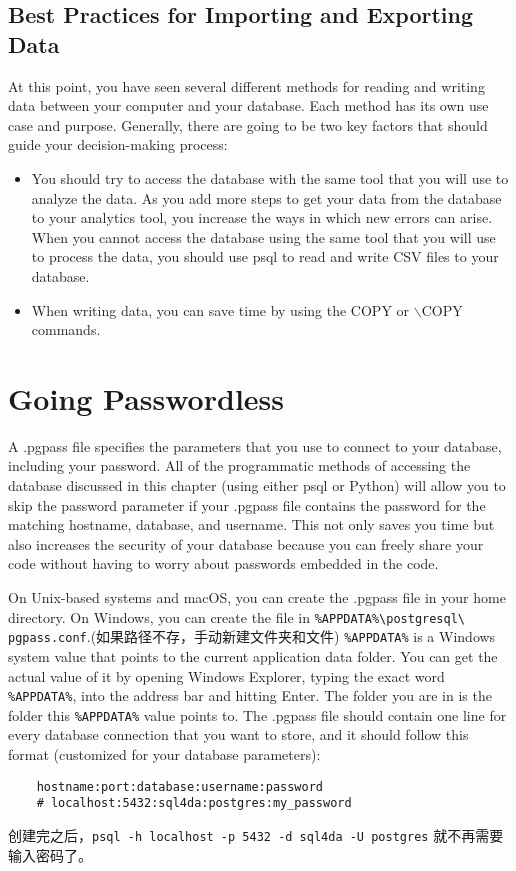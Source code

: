 \subsection{Best Practices for Importing and Exporting Data}
At this point, you have seen several different methods for reading and writing data
between your computer and your database. Each method has its own use case and
purpose. Generally, there are going to be two key factors that should guide your
decision-making process:
\begin{itemize}
    \item You should try to access the database with the same tool that you will use to analyze the data. As you add more steps to get your data from the database to your analytics tool, you increase the ways in which new errors can arise. When you cannot access the database using the same tool that you will use to process the data, you should use psql to read and write CSV files to your database.
    \item  When writing data, you can save time by using the COPY or $\backslash$COPY commands.
\end{itemize}
\section{Going Passwordless}
A .pgpass file specifies the parameters that you use to connect to your database, including your password. All of the programmatic methods of accessing the database discussed in this chapter (using either psql or Python) will allow you to skip the password parameter if your .pgpass file contains the password for the matching hostname, database, and username. This not only saves you time but also increases the security of your database because you can freely share your code without having to worry about passwords embedded in the code.

On Unix-based systems and macOS, you can create the .pgpass file in your home directory. On Windows, you can create the file in \verb|%APPDATA%\postgresql\ pgpass.conf|.(如果路径不存，手动新建文件夹和文件) \verb|%APPDATA%| is a Windows system value that points to the current application data folder. You can get the actual value of it by opening Windows Explorer, typing the exact word \verb|%APPDATA%|, into the address bar and hitting Enter. The folder you are in is the folder this \verb|%APPDATA%| value points to. The .pgpass file should contain one line for every database connection that you want to store, and it should follow this format (customized for your database parameters):
\begin{verbatim}
    hostname:port:database:username:password
    # localhost:5432:sql4da:postgres:my_password
\end{verbatim}

创建完之后，\verb|psql -h localhost -p 5432 -d sql4da -U postgres| 就不再需要输入密码了。
